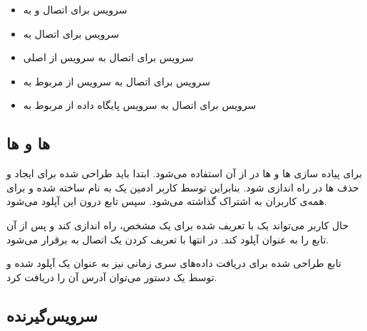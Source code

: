 \begin{itemize}

	\item سرویس  برای اتصال  و  به 
	
	\item سرویس  برای اتصال به 
	
	\item سرویس  برای اتصال به سرویس  از  اصلی
	
	\item سرویس  برای اتصال به سرویس  از  مربوط به 
	
	\item سرویس  برای اتصال به سرویس پایگاه داده  از  مربوط به 

\end{itemize}

\subsection{ ها و  ها}

برای پیاده سازی  ها و  ها در  از  آن استفاده می‌شود. ابتدا باید  طراحی شده برای ایجاد و حذف  ها در  راه اندازی شود. بنابراین توسط کاربر ادمین  یک  به نام  ساخته شده و برای همه‌ی کاربران به اشتراک گذاشته می‌شود. سپس تابع  درون این  آپلود می‌شود.

حال کاربر می‌تواند یک  با  تعریف شده برای یک  مشخص، راه اندازی کند و پس از آن تابع  را به عنوان  آپلود کند. در انتها با تعریف کردن یک  اتصال  به  برقرار می‌شود.

تابع طراحی شده برای دریافت داده‌های سری زمانی نیز به عنوان یک  آپلود شده و توسط یک دستور  می‌توان آدرس آن را دریافت کرد.

\subsection{سرویس‌گیرنده}
